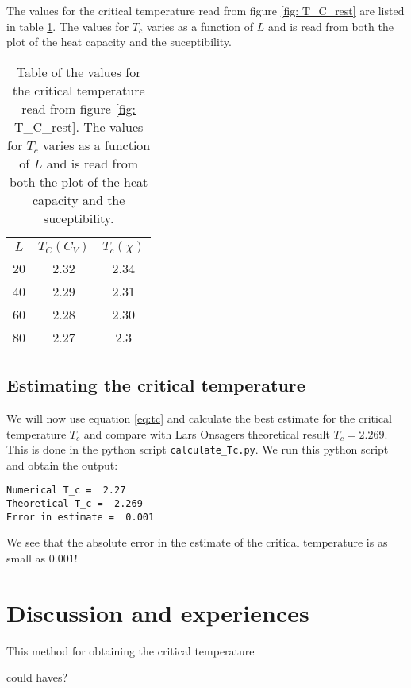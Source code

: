 \documentclass[11pt,a4wide]{article}
\begin{document}
The values for the critical temperature read from figure \ref{fig:  T_C_rest} are listed in table \ref{tab: T_c}. The values for $T_c$ varies as a function of $L$ and is read from both the plot of the heat capacity and the suceptibility.

\begin{table}
\centering
\caption{Table of the values for the critical temperature read from figure \ref{fig:  T_C_rest}. The values for $T_c$ varies as a function of $L$ and is read from both the plot of the heat capacity and the suceptibility.}
\begin{tabular}{|c|c|c|}
\hline 
$L$ & $T_C (C_V)$ & $T_c(\chi)$ \\ 
\hline 
20 & 2.32 & 2.34 \\ 
\hline 
40 & 2.29 & 2.31 \\ 
\hline 
60 & 2.28 & 2.30 \\ 
\hline 
80 & 2.27 & 2.3 \\ 
\hline 
\end{tabular}
\label{tab: T_c}
\end{table}

\subsection{Estimating the critical temperature}
We will now use equation \ref{eq:tc} and calculate the best estimate for the critical temperature $T_c$ and compare with Lars Onsagers theoretical result $T_c = 2.269$. This is done in the python script \texttt{calculate\_Tc.py}. We run this python script and obtain the output:
\begin{lstlisting}
Numerical T_c =  2.27
Theoretical T_c =  2.269
Error in estimate =  0.001
\end{lstlisting}
We see that the absolute error in the estimate of the critical temperature is as small as 0.001! 

\section{Discussion and experiences}

This method for obtaining the critical temperature


could haves?



\newpage
\end{document}

